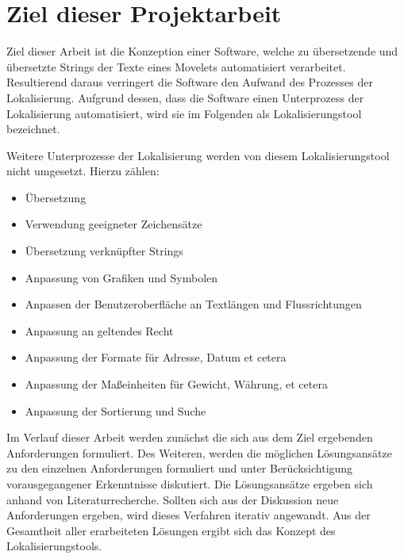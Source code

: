 \section{Ziel dieser Projektarbeit}
Ziel dieser Arbeit ist die Konzeption einer Software, welche zu übersetzende und übersetzte Strings der Texte eines Movelets automatisiert verarbeitet. Resultierend daraus verringert die Software den Aufwand des Prozesses der Lokalisierung. Aufgrund dessen, dass die Software einen Unterprozess der Lokalisierung automatisiert, wird sie im Folgenden als Lokalisierungstool bezeichnet. 
\par
Weitere Unterprozesse der Lokalisierung werden von diesem Lokalisierungstool nicht umgesetzt. Hierzu zählen:
\begin{itemize}
	\item Übersetzung
	\item Verwendung geeigneter Zeichensätze
	\item Übersetzung verknüpfter Strings
	\item Anpassung von Grafiken und Symbolen
	\item Anpassen der Benutzeroberfläche an Textlängen und Flussrichtungen
	\item Anpassung an geltendes Recht
	\item Anpassung der Formate für Adresse, Datum et cetera
	\item Anpassung der Maßeinheiten für Gewicht, Währung, et cetera
	\item Anpassung der Sortierung und Suche
\end{itemize}
\autocite[Vgl.][S. 423]{HassellCorbiell.2001}
\autocite[Vgl.][]{Asnes.2010}
\autocite[Vgl.][]{Wagner.2017}
\par
Im Verlauf dieser Arbeit werden zunächst die sich aus dem Ziel ergebenden Anforderungen formuliert. Des Weiteren, werden die möglichen Lösungsansätze zu den einzelnen Anforderungen formuliert und unter Berücksichtigung vorausgegangener Erkenntnisse diskutiert. Die Lösungsansätze ergeben sich anhand von Literaturrecherche. Sollten sich aus der Diskussion neue Anforderungen ergeben, wird dieses Verfahren iterativ angewandt. Aus der Gesamtheit aller erarbeiteten Lösungen ergibt sich das Konzept des Lokalisierungstools. 